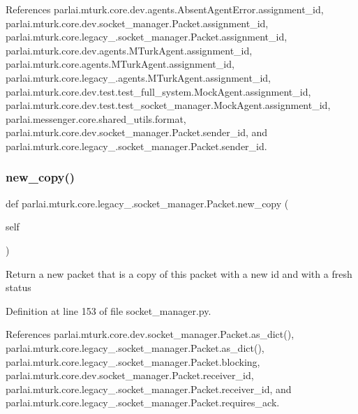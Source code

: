 References parlai.\+mturk.\+core.\+dev.\+agents.\+Absent\+Agent\+Error.\+assignment\+\_\+id, parlai.\+mturk.\+core.\+dev.\+socket\+\_\+manager.\+Packet.\+assignment\+\_\+id, parlai.\+mturk.\+core.\+legacy\+\_.\+socket\+\_\+manager.\+Packet.\+assignment\+\_\+id, parlai.\+mturk.\+core.\+dev.\+agents.\+M\+Turk\+Agent.\+assignment\+\_\+id, parlai.\+mturk.\+core.\+agents.\+M\+Turk\+Agent.\+assignment\+\_\+id, parlai.\+mturk.\+core.\+legacy\+\_.\+agents.\+M\+Turk\+Agent.\+assignment\+\_\+id, parlai.\+mturk.\+core.\+dev.\+test.\+test\+\_\+full\+\_\+system.\+Mock\+Agent.\+assignment\+\_\+id, parlai.\+mturk.\+core.\+dev.\+test.\+test\+\_\+socket\+\_\+manager.\+Mock\+Agent.\+assignment\+\_\+id, parlai.\+messenger.\+core.\+shared\+\_\+utils.\+format, parlai.\+mturk.\+core.\+dev.\+socket\+\_\+manager.\+Packet.\+sender\+\_\+id, and parlai.\+mturk.\+core.\+legacy\+\_.\+socket\+\_\+manager.\+Packet.\+sender\+\_\+id.

\mbox{\label{classparlai_1_1mturk_1_1core_1_1legacy__2018_1_1socket__manager_1_1Packet_aabcd943398680a33c0a313da2ec1a767}} 
\subsubsection{\texorpdfstring{new\+\_\+copy()}{new\_copy()}}
{\footnotesize\ttfamily def parlai.\+mturk.\+core.\+legacy\+\_.\+socket\+\_\+manager.\+Packet.\+new\+\_\+copy (\begin{DoxyParamCaption}\item[{}]{self }\end{DoxyParamCaption})}

\begin{DoxyVerb}Return a new packet that is a copy of this packet with
a new id and with a fresh status
\end{DoxyVerb}
 

Definition at line 153 of file socket\+\_\+manager.\+py.



References parlai.\+mturk.\+core.\+dev.\+socket\+\_\+manager.\+Packet.\+as\+\_\+dict(), parlai.\+mturk.\+core.\+legacy\+\_.\+socket\+\_\+manager.\+Packet.\+as\+\_\+dict(), parlai.\+mturk.\+core.\+legacy\+\_.\+socket\+\_\+manager.\+Packet.\+blocking, parlai.\+mturk.\+core.\+dev.\+socket\+\_\+manager.\+Packet.\+receiver\+\_\+id, parlai.\+mturk.\+core.\+legacy\+\_.\+socket\+\_\+manager.\+Packet.\+receiver\+\_\+id, and parlai.\+mturk.\+core.\+legacy\+\_.\+socket\+\_\+manager.\+Packet.\+requires\+\_\+ack.

